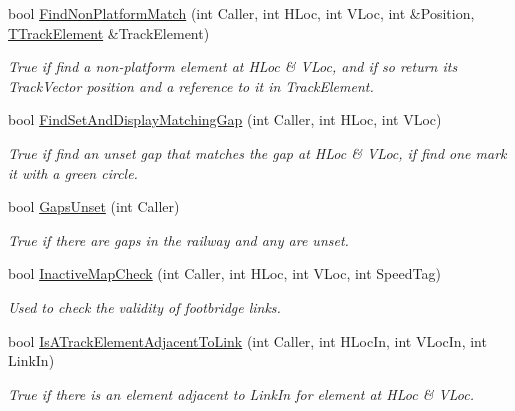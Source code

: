 \begin{DoxyCompactItemize}
bool \mbox{\hyperlink{class_t_track_ad55e3329a208e84e9e7519cc024b7aec}{Find\+Non\+Platform\+Match}} (int Caller, int H\+Loc, int V\+Loc, int \&Position, \mbox{\hyperlink{class_t_track_element}{T\+Track\+Element}} \&Track\+Element)
\begin{DoxyCompactList}\small\item\em True if find a non-\/platform element at H\+Loc \& V\+Loc, and if so return its Track\+Vector position and a reference to it in Track\+Element. \end{DoxyCompactList}\item 
\mbox{\label{class_t_track_a4109e356d902de07ebb8848acbee364a}} 
bool \mbox{\hyperlink{class_t_track_a4109e356d902de07ebb8848acbee364a}{Find\+Set\+And\+Display\+Matching\+Gap}} (int Caller, int H\+Loc, int V\+Loc)
\begin{DoxyCompactList}\small\item\em True if find an unset gap that matches the gap at H\+Loc \& V\+Loc, if find one mark it with a green circle. \end{DoxyCompactList}\item 
\mbox{\label{class_t_track_a794daa0471b473e28ff24c87a92112dc}} 
bool \mbox{\hyperlink{class_t_track_a794daa0471b473e28ff24c87a92112dc}{Gaps\+Unset}} (int Caller)
\begin{DoxyCompactList}\small\item\em True if there are gaps in the railway and any are unset. \end{DoxyCompactList}\item 
\mbox{\label{class_t_track_a23030c22d4c98706d1738205242646d9}} 
bool \mbox{\hyperlink{class_t_track_a23030c22d4c98706d1738205242646d9}{Inactive\+Map\+Check}} (int Caller, int H\+Loc, int V\+Loc, int Speed\+Tag)
\begin{DoxyCompactList}\small\item\em Used to check the validity of footbridge links. \end{DoxyCompactList}\item 
\mbox{\label{class_t_track_a5259f2d309f98df4f6e2821e7e71ca81}} 
bool \mbox{\hyperlink{class_t_track_a5259f2d309f98df4f6e2821e7e71ca81}{Is\+A\+Track\+Element\+Adjacent\+To\+Link}} (int Caller, int H\+Loc\+In, int V\+Loc\+In, int Link\+In)
\begin{DoxyCompactList}\small\item\em True if there is an element adjacent to Link\+In for element at H\+Loc \& V\+Loc. \end{DoxyCompactList}\item 

\end{DoxyCompactItemize}
